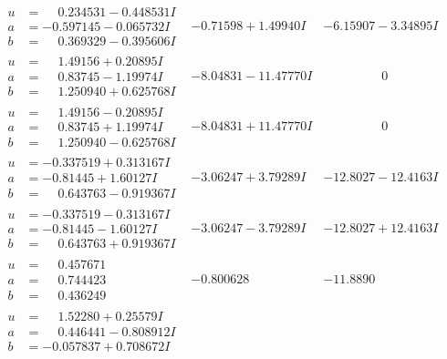 \documentclass[1p]{elsarticle_modified}
\theoremstyle{definition}
\begin{document}
$$\begin{array}{c|c|c}
\begin{aligned}
u &= \phantom{-}0.234531 - 0.448531 I \\
a &= -0.597145 - 0.065732 I \\
b &= \phantom{-}0.369329 - 0.395606 I\end{aligned}
 & -0.71598 + 1.49940 I & -6.15907 - 3.34895 I \\ \hline\begin{aligned}
u &= \phantom{-}1.49156 + 0.20895 I \\
a &= \phantom{-}0.83745 - 1.19974 I \\
b &= \phantom{-}1.250940 + 0.625768 I\end{aligned}
 & -8.04831 - 11.47770 I & \phantom{-0.000000 } 0 \\ \hline\begin{aligned}
u &= \phantom{-}1.49156 - 0.20895 I \\
a &= \phantom{-}0.83745 + 1.19974 I \\
b &= \phantom{-}1.250940 - 0.625768 I\end{aligned}
 & -8.04831 + 11.47770 I & \phantom{-0.000000 } 0 \\ \hline\begin{aligned}
u &= -0.337519 + 0.313167 I \\
a &= -0.81445 + 1.60127 I \\
b &= \phantom{-}0.643763 - 0.919367 I\end{aligned}
 & -3.06247 + 3.79289 I & -12.8027 - 12.4163 I \\ \hline\begin{aligned}
u &= -0.337519 - 0.313167 I \\
a &= -0.81445 - 1.60127 I \\
b &= \phantom{-}0.643763 + 0.919367 I\end{aligned}
 & -3.06247 - 3.79289 I & -12.8027 + 12.4163 I \\ \hline\begin{aligned}
u &= \phantom{-}0.457671\phantom{ +0.000000I} \\
a &= \phantom{-}0.744423\phantom{ +0.000000I} \\
b &= \phantom{-}0.436249\phantom{ +0.000000I}\end{aligned}
 & -0.800628\phantom{ +0.000000I} & -11.8890\phantom{ +0.000000I} \\ \hline\begin{aligned}
u &= \phantom{-}1.52280 + 0.25579 I \\
a &= \phantom{-}0.446441 - 0.808912 I \\
b &= -0.057837 + 0.708672 I\end{aligned}

\end{array}$$
\end{document}
